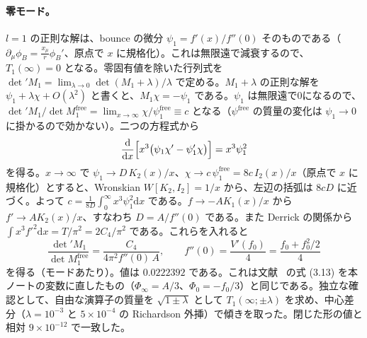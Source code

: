 \documentclass[a4paper,10pt]{ltjsarticle}
\newcommand{\dd}{\mathrm{d}}
\begin{document}
\paragraph{零モード。}$l=1$ の正則な解は、bounce の微分 $\psi_1=f'(x)/f''(0)$ そのものである（$\partial_\mu\phi_B=\frac{x_\mu}{r}\phi_B'$、原点で $x$ に規格化）。これは無限遠で減衰するので、$T_1(\infty)=0$ となる。零固有値を除いた行列式を $\det'M_1=\lim_{\lambda\to0}\det(M_1+\lambda)/\lambda$ で定める。$M_1+\lambda$ の正則な解を $\psi_1+\lambda\chi+O(\lambda^2)$ と書くと、$M_1\chi=-\psi_1$ である。$\psi_1$ は無限遠で0になるので、$\det'M_1/\det M_1^{\mathrm{free}}=\lim_{x\to\infty}\chi/\psi_1^{\mathrm{free}}\equiv c$ となる（$\psi^{\mathrm{free}}$ の質量の変化は $\psi_1\to0$ に掛かるので効かない）。二つの方程式から
\begin{equation*}
\frac{\dd}{\dd x}\Bigl[x^3\bigl(\psi_1\chi'-\psi_1'\chi\bigr)\Bigr]=x^3\psi_1^2
\end{equation*}
を得る。$x\to\infty$ で $\psi_1\to D\,K_2(x)/x$、$\chi\to c\,\psi_1^{\mathrm{free}}=8c\,I_2(x)/x$（原点で $x$ に規格化）とすると、Wronskian $W[K_2,I_2]=1/x$ から、左辺の括弧は $8cD$ に近づく。よって $c=\frac{1}{8D}\int_0^\infty x^3\psi_1^2\dd x$ である。$f\to-AK_1(x)/x$ から $f'\to AK_2(x)/x$、すなわち $D=A/f''(0)$ である。また Derrick の関係から $\int x^3f'^2\dd x=T/\pi^2=2C_4/\pi^2$ である。これらを入れると
\begin{equation*}
\frac{\det'M_1}{\det M_1^{\mathrm{free}}}=\frac{C_4}{4\pi^2f''(0)\,A},\qquad f''(0)=\frac{V'(f_0)}{4}=\frac{f_0+f_0^2/2}{4}
\end{equation*}
を得る（モードあたり）。値は $0.0222392$ である。これは文献~\cite{dunnemin} の式 (3.13) を本ノートの変数に直したもの（$\Phi_\infty=A/3$、$\Phi_0=-f_0/3$）と同じである。独立な確認として、自由な演算子の質量を $\sqrt{1\pm\lambda}$ として $T_1(\infty;\pm\lambda)$ を求め、中心差分（$\lambda=10^{-3}$ と $5\times10^{-4}$ の Richardson 外挿）で傾きを取った。閉じた形の値と相対 $9\times10^{-12}$ で一致した。
\end{document}
